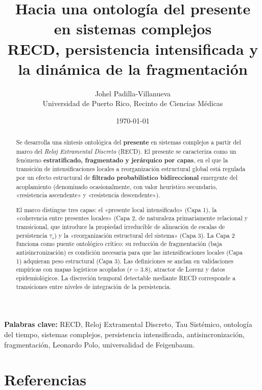 \documentclass[11pt,a4paper]{article}
\title{\textbf{Hacia una ontología del presente en sistemas complejos}\\[0.3em]
\large RECD, persistencia intensificada y la dinámica de la fragmentación}
\author{Johel Padilla-Villanueva\\
\small Universidad de Puerto Rico, Recinto de Ciencias Médicas}
\date{\today}
\begin{document}
\maketitle

\begin{abstract}
Se desarrolla una síntesis ontológica del \textbf{presente} en sistemas complejos a partir del marco del \textit{Reloj Extramental Discreto} (RECD). El presente se caracteriza como un fenómeno \textbf{estratificado, fragmentado y jerárquico por capas}, en el que la transición de intensificaciones locales a reorganización estructural global está regulada por un efecto estructural de \textbf{filtrado probabilístico bidireccional} emergente del acoplamiento (denominado ocasionalmente, con valor heurístico secundario, «resistencia ascendente» y «resistencia descendente»).

El marco distingue tres capas: el «presente local intensificado» (Capa 1), la «coherencia entre presentes locales» (Capa 2, de naturaleza primariamente relacional y transicional, que introduce la propiedad irreducible de alineación de escalas de persistencia $\tau_s$) y la «reorganización estructural del sistema» (Capa 3). La Capa 2 funciona como puente ontológico crítico: su reducción de fragmentación (baja antisincronización) es condición necesaria para que las intensificaciones locales (Capa 1) adquieran peso estructural (Capa 3). Las definiciones se anclan en validaciones empíricas con mapas logísticos acoplados ($r=3.8$), atractor de Lorenz y datos epidemiológicos. La discreción temporal detectable mediante RECD corresponde a transiciones entre niveles de integración de la persistencia.
\end{abstract}

\noindent\textbf{Palabras clave:} RECD, Reloj Extramental Discreto, Tau Sistémico, ontología del tiempo, sistemas complejos, persistencia intensificada, antisincronización, fragmentación, Leonardo Polo, universalidad de Feigenbaum.

\newpage
\tableofcontents
\newpage










\section*{Referencias}

\sloppy

\normalfont
\end{document}
